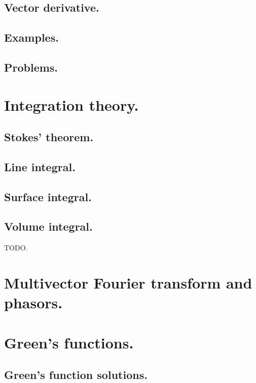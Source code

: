       \subsection{Vector derivative.}
         
      \subsection{Examples.}
         
      \subsection{Problems.}
         
         
         
   \section{Integration theory.}
      
   \subsection{Stokes' theorem.}
      
   \subsection{Line integral.}
      
   \subsection{Surface integral.}
      
   \subsection{Volume integral.}
      TODO.
   \section{Multivector Fourier transform and phasors.}
      
   \section{Green's functions.}
      
      \subsection{Green's function solutions.}
         
